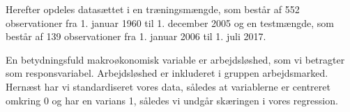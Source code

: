 %
Herefter opdeles datasættet i en træningsmængde, som består af 552 observationer fra 1. januar 1960 til 1. december 2005 og en testmængde, som består af 139 observationer fra 1. januar 2006 til 1. juli 2017. 

En betydningsfuld makroøkonomisk variable er arbejdsløshed, som vi betragter som responsvariabel.  
Arbejdsløshed er inkluderet i gruppen arbejdsmarked.
Hernæst har vi standardiseret vores data, således at variablerne er centreret omkring 0 og har en varians 1, således vi undgår skæringen i vores regression.
 



